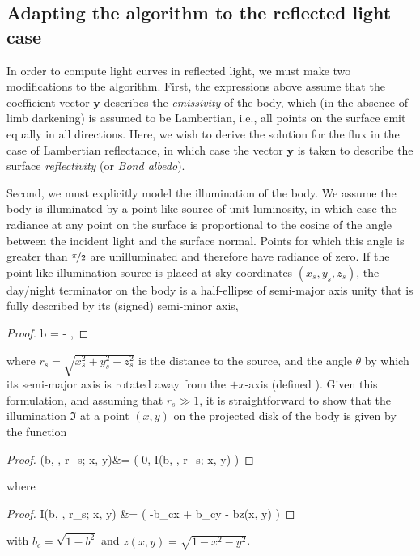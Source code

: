 \documentclass[modern]{aastex62}
\begin{document}
\subsection{Adapting the algorithm to the reflected light case}
\label{sec:starry-review}
%
In order to compute light curves in reflected light, we must make two
modifications to the \starry algorithm. First,
the expressions above assume that the coefficient vector
$\mathbf{y}$ describes the \emph{emissivity} of the body, which (in the
absence of limb darkening) is assumed to be Lambertian, i.e., all points on the
surface emit equally in all directions.
Here, we wish to derive the solution for the flux in the case of Lambertian
reflectance, in which case the vector $\mathbf{y}$ is taken to describe the
surface \emph{reflectivity} (or \emph{Bond albedo}).

Second, we must explicitly model the illumination of the body. We assume the
body is illuminated by a point-like source of unit luminosity, in which case
the radiance at any
point on the surface is proportional to the cosine of the angle between
the incident light and the surface normal. Points for which
this angle is greater than $\nicefrac{\pi}{2}$ are unilluminated and
therefore have radiance of zero.
%
If the point-like illumination source is placed at sky coordinates
$(x_s, y_s, z_s)$, the day/night terminator on the body is a half-ellipse
of semi-major axis unity that is fully described by its (signed) semi-minor
axis,
%
\begin{proof}{}
    \label{eq:b}
    b = -
    \quad,
\end{proof}
%
where $r_s = \sqrt{x_s^2 + y_s^2 + z_s^2}$ is the distance to the source,
%
and the angle $\theta$ by which its semi-major axis is rotated away from the
$+x$-axis (defined ).
Given this formulation, and assuming that
$r_s \gg 1$,
it is straightforward to show that the illumination
$\mathfrak{I}$ at a point $(x, y)$ on the projected disk of the body is given
by the function
%
\begin{proof}{}
    \label{eq:illum}
    (b, \theta, r_s; x, y)&=
    \bigg( 0, I(b, \theta, r_s; x, y) \bigg)
\end{proof}
%
where
%
\begin{proof}{}
    \label{eq:illum_poly}
    I(b, \theta, r_s; x, y) &= 
    \bigg(
    -b_c\sin\theta x + b_c\cos\theta y - bz(x, y)
    \bigg)
\end{proof}
%
with $b_c = \sqrt{1 - b^2}$ and $z(x, y) = \sqrt{1 - x^2 - y^2}$.
\end{document}
